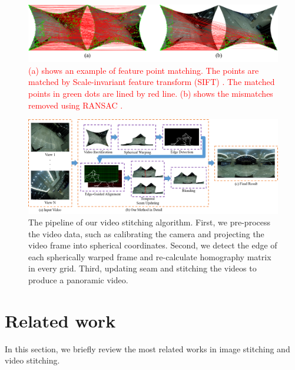 \documentclass[conference]{IEEEtran}
\begin{document}
\begin{figure}[!htbp]
\centering
\includegraphics[scale=0.26]{picture60.png}
\caption{\textcolor{red}{(a) shows an example of feature point matching. The points are matched by Scale-invariant feature transform (SIFT) \cite{lowe1999object}. 
The matched points in green dots are lined by red line. (b) shows the mismatches removed using RANSAC \cite{fischler1981random}.}}
\label{fig:failSIFT}
\end{figure}

\begin{figure}
\centering
\includegraphics[scale=0.54]{picture52.png}
\caption{The pipeline of our video stitching algorithm. First, we pre-process the video data, such as calibrating the camera
and projecting the video frame into spherical coordinates. Second, we detect the edge of each spherically
warped frame and re-calculate
homography matrix in every grid. Third, updating seam and stitching the videos to produce a panoramic video.}
\label{fig:res}
\end{figure}

\section{Related work}
\label{sec:related}

In this section, we briefly review the most related works in image stitching and video stitching.
\end{document}
